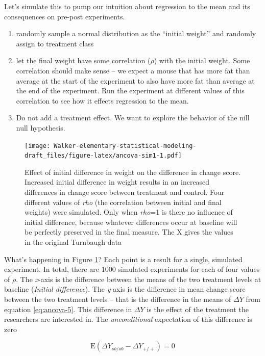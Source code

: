 \documentclass[]{book}
\providecommand{\tightlist}{%
  \setlength{\itemsep}{0pt}\setlength{\parskip}{0pt}}
\begin{document}
Let's simulate this to pump our intuition about regression to the mean and its consequences on pre-post experiments.

\begin{enumerate}
\def\labelenumi{\arabic{enumi}.}
\tightlist
\item
  randomly sample a normal distribution as the ``initial weight'' and randomly assign to treatment class
\item
  let the final weight have some correlation (\(\rho\)) with the initial weight. Some correlation should make sense -- we expect a mouse that has more fat than average at the start of the experiment to also have more fat than average at the end of the experiment. Run the experiment at different values of this correlation to see how it effects regression to the mean.
\item
  Do not add a treatment effect. We want to explore the behavior of the nill null hypothesis.
\end{enumerate}

\begin{figure}
\centering
\texttt{[image: Walker-elementary-statistical-modeling-draft\_files/figure-latex/ancova-sim1-1.pdf]}
\caption{\label{fig:ancova-sim1}Effect of initial difference in weight on the difference in change score. Increased initial difference in weight results in an increased differences in change score between treatment and control. Four different values of \emph{rho} (the correlation between initial and final weights) were simulated. Only when \emph{rho}=1 is there no influence of initial difference, because whatever differences occur at baseline will be perfectly preserved in the final measure. The X gives the values in the original Turnbaugh data}
\end{figure}

What's happening in Figure \ref{fig:ancova-sim1}? Each point is a result for a single, simulated experiment. In total, there are 1000 simulated experiments for each of four values of \(\rho\). The \emph{x}-axis is the difference between the means of the two treatment levels at baseline (\emph{Initial difference}). The \emph{y}-axis is the difference in mean change score between the two treatment levels -- that is the difference in the means of \(\Delta Y\) from equation \eqref{eq:ancova-5}. This difference in \(\Delta Y\) is the effect of the treatment the researchers are interested in. The \emph{unconditional} expectation of this difference is zero

\begin{equation}
\mathrm{E}(\Delta Y_{ob/ob} - \Delta Y_{+/+}) = 0
\end{equation}
\end{document}
